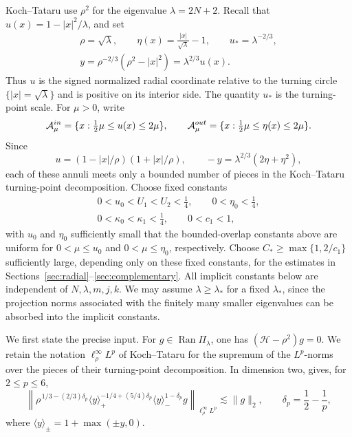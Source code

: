 \documentclass[10pt,a4paper]{amsart}
\numberwithin{equation}{section}
\newcommand{\norm}[1]{\lVert #1\rVert}
\begin{document}
Koch--Tataru use \(\rho^2\) for the eigenvalue \(\lambda=2N+2\). Recall that
\(u(x)=1-|x|^2/\lambda\), and set
\[
 \begin{gathered}
  \rho=\sqrt\lambda,\qquad
  \eta(x)=\frac{|x|}{\sqrt\lambda}-1,
  \qquad u_*=\lambda^{-2/3},\\
  y=\rho^{-2/3}(\rho^2-|x|^2)=\lambda^{2/3}u(x).
 \end{gathered}
\]
Thus \(u\) is the signed normalized radial coordinate relative to the turning
circle \(\{|x|=\sqrt\lambda\}\) and is positive on its interior side.
The quantity \(u_*\) is the turning-point scale. For \(\mu>0\), write
\[
 \mathcal A_\mu^{\rm in}=\{x:\tfrac12\mu\le u(x)\le2\mu\},
 \qquad
 \mathcal A_\mu^{\rm out}=\{x:\tfrac12\mu\le\eta(x)\le2\mu\}.
\]
Since
\[
 u=(1-|x|/\rho)(1+|x|/\rho),
 \qquad -y=\lambda^{2/3}(2\eta+\eta^2),
\]
each of these annuli meets only a bounded number of pieces in the
Koch--Tataru turning-point decomposition.
Choose fixed constants
\begin{equation}\label{eq:lg-constant-hierarchy}
 \begin{gathered}
  0<u_0<U_1<U_2<\frac14,\qquad 0<\eta_0<\frac14,\\
  0<\kappa_0<\kappa_1<\frac14,\qquad 0<c_1<1,
 \end{gathered}
\end{equation}
with \(u_0\) and \(\eta_0\) sufficiently small that the bounded-overlap
constants above are uniform for \(0<\mu\le u_0\) and
\(0<\mu\le\eta_0\), respectively. Choose
\(C_*\ge\max\{1,2/c_1\}\) sufficiently large, depending only on these fixed
constants, for the estimates in Sections~\ref{sec:radial}--\ref{sec:complementary}.
All implicit constants below are independent of \(N,\lambda,m,j,k\). We may
assume \(\lambda\ge\lambda_*\) for a fixed \(\lambda_*\), since the projection
norms associated with the finitely many smaller eigenvalues can be absorbed
into the implicit constants.

We first state the precise input. For
\(g\in\operatorname{Ran}\Pi_\lambda\), one has
\((\mathcal H-\rho^2)g=0\). We retain the notation
\(\ell^\infty_\rho L^p\) of Koch--Tataru for the supremum of the
\(L^p\)-norms over the pieces of their turning-point decomposition. In
dimension two, \cite[Theorem~3(a)]{KochTataru} gives, for \(2\le p\le6\),
\begin{equation}\label{eq:KT-weighted}
 \left\|
 \rho^{\,1/3-(2/3)\delta_p}
 \langle y\rangle_+^{-1/4+(5/4)\delta_p}
 \langle y\rangle_-^{1-\delta_p}g
 \right\|_{\ell^\infty_\rho L^p}
 \lesssim\norm g_2,
 \qquad
 \delta_p=\frac12-\frac1p,
\end{equation}
where \(\langle y\rangle_\pm=1+\max(\pm y,0)\).
\end{document}
